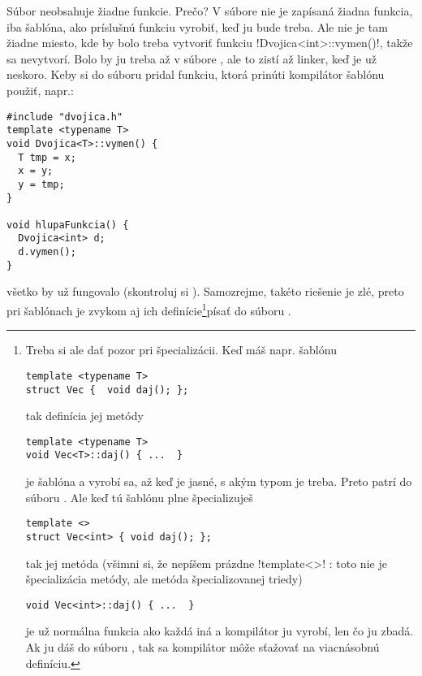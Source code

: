 Súbor  neobsahuje žiadne funkcie. Prečo? V súbore  nie je zapísaná žiadna funkcia, iba šablóna, ako príslušnú funkciu vyrobiť, keď ju bude treba.
Ale nie je tam žiadne miesto, kde by bolo treba vytvoriť funkciu \prg!Dvojica<int>::vymen()!, takže sa nevytvorí. Bolo by ju treba až v súbore , ale to zistí
až linker, keď je už neskoro. Keby si do súboru  pridal funkciu, ktorá prinúti kompilátor šablónu použiť, napr.:

\begin{lstlisting}
#include "dvojica.h"
template <typename T>
void Dvojica<T>::vymen() {
  T tmp = x;
  x = y;
  y = tmp;
}

void hlupaFunkcia() {
  Dvojica<int> d;
  d.vymen();
}
\end{lstlisting}

všetko by už fungovalo (skontroluj si  ). Samozrejme, takéto riešenie je zlé, 
preto pri šablónach je zvykom aj ich definície\footnote{
  Treba si ale dať pozor pri špecializácii. Keď máš napr. šablónu 

\begin{lstlisting}
template <typename T>
struct Vec {  void daj(); };
\end{lstlisting}

tak definícia jej metódy

\begin{lstlisting}
template <typename T>
void Vec<T>::daj() { ...  }
\end{lstlisting}

  je šablóna a vyrobí sa, až keď je jasné, s akým typom  je treba.
  Preto patrí do súboru . Ale keď tú šablónu plne špecializuješ 

\begin{lstlisting}
template <>
struct Vec<int> { void daj(); };
\end{lstlisting}
  
tak jej metóda (všimni si, že nepíšem prázdne \prg!template<>! : toto nie je 
špecializácia metódy, ale metóda špecializovanej triedy)

\begin{lstlisting}
void Vec<int>::daj() { ...  }
\end{lstlisting}

je už normálna funkcia ako každá iná a kompilátor ju vyrobí, len čo ju zbadá. Ak ju dáš do súboru
, tak sa kompilátor môže sťažovať na viacnásobnú definíciu.
}písať do súboru .


